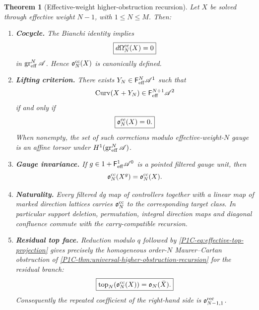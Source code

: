 \documentclass[11pt]{article}
\newtheorem{theorem}{Theorem}[section]
\theoremstyle{remark}
\begin{document}
\begin{theorem}[Effective-weight higher-obstruction recursion]
\label{P1C-thm:effective-weight-higher-recursion}
Let $X$ be solved through effective weight $N-1$, with $1\le N\le M$.  Then:
\begin{enumerate}[label=\textup{(\roman*)}]
\item \textbf{Cocycle.}  The Bianchi identity implies
\[
 \boxed{d\Omega_N^{\rm cc}(X)=0}
\]
in $\operatorname{gr}^{N}_{\rm eff}\mathscr A$.  Hence
$\mathfrak o_N^{\rm cc}(X)$ is canonically defined.
\item \textbf{Lifting criterion.}  There exists
$Y_N\in\mathsf F_{\rm eff}^{N}\mathscr A^1$ such that
\[
 \operatorname{Curv}(X+Y_N)\in\mathsf F_{\rm eff}^{N+1}\mathscr A^2
\]
if and only if
\[
 \boxed{\mathfrak o_N^{\rm cc}(X)=0.}
\]
When nonempty, the set of such corrections modulo effective-weight-$N$ gauge is an affine torsor
under $H^1(\operatorname{gr}^{N}_{\rm eff}\mathscr A)$.
\item \textbf{Gauge invariance.}  If $g\in1+\mathsf F_{\rm eff}^{1}\mathscr A^0$ is a pointed filtered
gauge unit, then
\[
 \mathfrak o_N^{\rm cc}(X^g)=\mathfrak o_N^{\rm cc}(X).
\]
\item \textbf{Naturality.}  Every filtered dg map of controllers together with a linear map of marked
direction lattices carries $\mathfrak o_N^{\rm cc}$ to the corresponding target class.  In particular
support deletion, permutation, integral direction maps and diagonal confluence commute with the
carry-compatible recursion.
\item \textbf{Residual top face.}  Reduction modulo $q$ followed by
\eqref{P1C-eq:effective-top-projection} gives precisely the homogeneous order-$N$ Maurer--Cartan
obstruction of \cref{P1C-thm:universal-higher-obstruction-recursion} for the residual branch:
\begin{equation}\label{P1C-eq:cc-to-residual-obstruction}
 \boxed{
 \operatorname{top}_N(\mathfrak o_N^{\rm cc}(X))
 =\mathfrak o_N(\bar X).}
\end{equation}
Consequently the repeated coefficient of the right-hand side is
$\mathfrak o^{\rm rec}_{N-1,1}$.
\end{enumerate}
\end{theorem}
\end{document}
